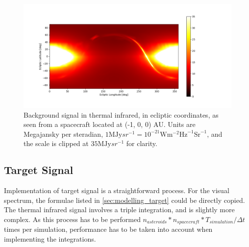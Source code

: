 \begin{figure}[htbp]
 \centering
 \includegraphics[width=1.0\textwidth]{img/background_tir_combined.png}
 \caption{Background signal in thermal infrared, in ecliptic coordinates, as seen from a spacecraft located at (-1, 0, 0) AU. Units are Megajansky per steradian, $1 \mathrm{MJy}{sr}^{-1} = 10^{-21} \mathrm{W}\mathrm{m}^{-2}\mathrm{Hz}^{-1}\mathrm{Sr}^{-1}$, and the scale is clipped at $35 \mathrm{MJy}{sr}^{-1}$ for clarity.}
 \label{fig:combinedtirbackground}
\end{figure}

\subsection{Target Signal}
Implementation of target signal is a straightforward process. For the visual spectrum, the formulae listed in \autoref{sec:modelling_target} could be directly copied. The thermal infrared signal involves a triple integration, and is slightly more complex. As this process has to be performed $n_{asteroids} * n_{spacecraft} * T_{simulation} / \Delta t$ times per simulation, performance has to be taken into account when implementing the integrations. \\

